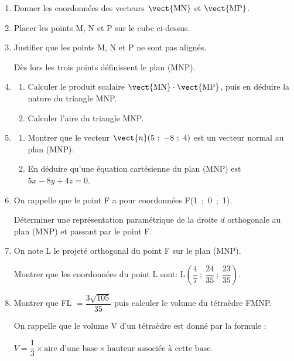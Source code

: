 \begin{enumerate}
\item Donner les coordonnées des vecteurs $\vect{\text{MN}}$ et $\vect{\text{MP}}$.
\item Placer les points M, N et P sur le cube ci-dessus.
\item Justifier que les points M, N et P ne sont pas alignés. 

Dès lors les trois points définissent le plan (MNP).
\item 
	\begin{enumerate}
		\item Calculer le produit scalaire $\vect{\text{MN}} \cdot \vect{\text{MP}}$, puis en déduire la nature du triangle MNP.
		\item Calculer l'aire du triangle MNP.
	\end{enumerate}
\item 
	\begin{enumerate}
		\item Montrer que le vecteur $\vect{n}(5~;~-8~;~4)$ est un vecteur normal au plan (MNP).
		\item En déduire qu'une équation cartésienne du plan (MNP) est $5x - 8y + 4z = 0$.
	\end{enumerate}	
\item On rappelle que le point F a pour coordonnées F(1~;~0~;~1). 

Déterminer une représentation paramétrique de la droite $d$ orthogonale au plan (MNP) et passant par le point F.
\item On note L le projeté orthogonal du point F sur le plan (MNP). 

Montrer que les coordonnées du point L sont: L$\left(\dfrac47~;~\dfrac{24}{35}~;~\dfrac{23}{35}\right)$.
\item Montrer que FL $= \dfrac{3\sqrt{105}}{35}$ puis calculer le volume du tétraèdre FMNP. 

On rappelle que le volume V d'un tétraèdre est donné par la formule :

\begin{center}$V = \dfrac13 \times  \text{aire d'une base} \times \text{hauteur associée à cette base}$.\end{center}

\end{enumerate}

\medskip
